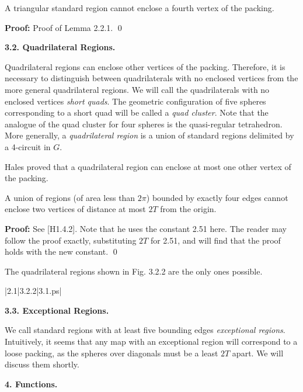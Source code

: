  A triangular standard region cannot enclose a fourth 
vertex of the packing. \endproclaim

{\bf Proof:} Proof of Lemma 2.2.1. \qed

\bigskip

{\bf 3.2. Quadrilateral Regions.}

\bigskip

Quadrilateral regions can enclose other vertices of the packing.  Therefore, it is 
necessary to distinguish between quadrilaterals with no enclosed vertices from
the more general quadrilateral regions.  We will call the quadrilaterals
with no enclosed vertices {\it short quads}.  The geometric configuration of five spheres
corresponding to a short quad will be called a {\it quad cluster}.  
Note that the analogue of the quad cluster for four spheres 
is the quasi-regular tetrahedron.  More generally, a {\it quadrilateral region}
 is a union of standard regions delimited by a 4-circuit in $G$.  

Hales proved that a quadrilateral region can enclose at most one other vertex of the packing.


 A union of regions (of area less than $2\pi$) 
bounded by exactly four edges cannot enclose two vertices of distance at 
most $2T$ from the origin.  \endproclaim

{\bf Proof:} See [H1.4.2].  Note that he uses the constant 2.51 here. 
 The reader may follow the proof exactly, substituting $2T$ for 2.51, and will 
find that the proof holds with the new constant. \qed

\bigskip

 The quadrilateral regions shown in Fig. 3.2.2 are the only ones
 possible.  \endproclaim


\gram|2.1|3.2.2|3.1.ps|  %


\bigskip

{\bf 3.3. Exceptional Regions.}

\bigskip

We call standard regions with at least five bounding edges {\it exceptional regions}.  
Intuitively, it seems that any map with an exceptional region will correspond
to a loose packing, as the spheres over diagonals must be a least $2T$ apart.  
We will
discuss them shortly.

\bigskip

\centerline{{\bf 4. Functions.}}

